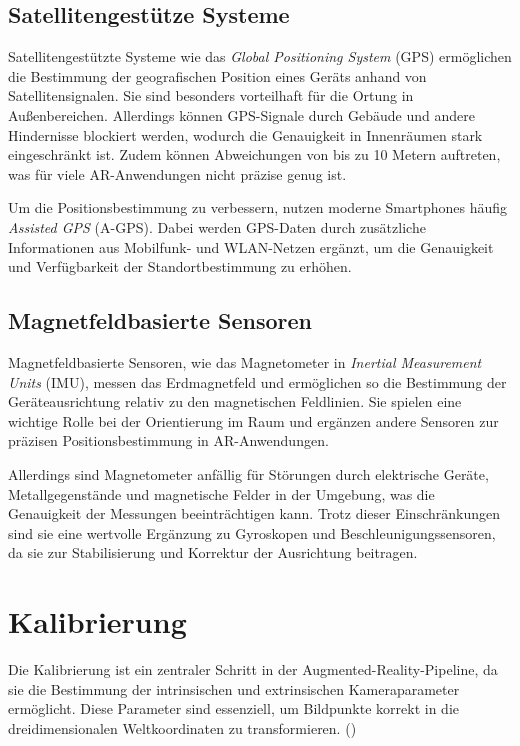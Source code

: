 \subsection{Satellitengestütze Systeme}

Satellitengestützte Systeme wie das \textit{Global Positioning System} (GPS) ermöglichen die Bestimmung der geografischen Position eines Geräts anhand von Satellitensignalen. Sie sind besonders vorteilhaft für die Ortung in Außenbereichen. Allerdings können GPS-Signale durch Gebäude und andere Hindernisse blockiert werden, wodurch die Genauigkeit in Innenräumen stark eingeschränkt ist. Zudem können Abweichungen von bis zu 10 Metern auftreten, was für viele AR-Anwendungen nicht präzise genug ist.

Um die Positionsbestimmung zu verbessern, nutzen moderne Smartphones häufig \textit{Assisted GPS} (A-GPS). Dabei werden GPS-Daten durch zusätzliche Informationen aus Mobilfunk- und WLAN-Netzen ergänzt, um die Genauigkeit und Verfügbarkeit der Standortbestimmung zu erhöhen. \cite{doerner2022virtual}

\subsection{Magnetfeldbasierte Sensoren}

Magnetfeldbasierte Sensoren, wie das Magnetometer in \textit{Inertial Measurement Units} (IMU), messen das Erdmagnetfeld und ermöglichen so die Bestimmung der Geräteausrichtung relativ zu den magnetischen Feldlinien. Sie spielen eine wichtige Rolle bei der Orientierung im Raum und ergänzen andere Sensoren zur präzisen Positionsbestimmung in AR-Anwendungen. \cite{doerner2022virtual}

Allerdings sind Magnetometer anfällig für Störungen durch elektrische Geräte, Metallgegenstände und magnetische Felder in der Umgebung, was die Genauigkeit der Messungen beeinträchtigen kann. Trotz dieser Einschränkungen sind sie eine wertvolle Ergänzung zu Gyroskopen und Beschleunigungssensoren, da sie zur Stabilisierung und Korrektur der Ausrichtung beitragen. \cite{doerner2022virtual}

\section{Kalibrierung}\label{Kalibrierung}

Die Kalibrierung ist ein zentraler Schritt in der Augmented-Reality-Pipeline, da sie die Bestimmung der intrinsischen und extrinsischen Kameraparameter ermöglicht. Diese Parameter sind essenziell, um Bildpunkte korrekt in die dreidimensionalen Weltkoordinaten zu transformieren. (\cite{mw2024calibration})

